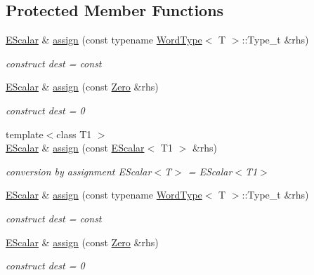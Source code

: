 \subsection*{Protected Member Functions}
\begin{DoxyCompactItemize}
\item 
\mbox{\hyperlink{classENSEM_1_1EScalar}{E\+Scalar}} \& \mbox{\hyperlink{classENSEM_1_1EScalar_a9b88ad4d69d05f69b6483701487ddb74}{assign}} (const typename \mbox{\hyperlink{structENSEM_1_1WordType}{Word\+Type}}$<$ T $>$\+::Type\+\_\+t \&rhs)
\begin{DoxyCompactList}\small\item\em construct dest = const \end{DoxyCompactList}\item 
\mbox{\hyperlink{classENSEM_1_1EScalar}{E\+Scalar}} \& \mbox{\hyperlink{classENSEM_1_1EScalar_a6900444b0a609115a30ef8fc95a43da5}{assign}} (const \mbox{\hyperlink{structENSEM_1_1Zero}{Zero}} \&rhs)
\begin{DoxyCompactList}\small\item\em construct dest = 0 \end{DoxyCompactList}\item 
{\footnotesize template$<$class T1 $>$ }\\\mbox{\hyperlink{classENSEM_1_1EScalar}{E\+Scalar}} \& \mbox{\hyperlink{classENSEM_1_1EScalar_aa9a54e03830d13eb6a124c64c6a46dd1}{assign}} (const \mbox{\hyperlink{classENSEM_1_1EScalar}{E\+Scalar}}$<$ T1 $>$ \&rhs)
\begin{DoxyCompactList}\small\item\em conversion by assignment E\+Scalar$<$\+T$>$ = E\+Scalar$<$\+T1$>$ \end{DoxyCompactList}\item 
\mbox{\hyperlink{classENSEM_1_1EScalar}{E\+Scalar}} \& \mbox{\hyperlink{classENSEM_1_1EScalar_a9b88ad4d69d05f69b6483701487ddb74}{assign}} (const typename \mbox{\hyperlink{structENSEM_1_1WordType}{Word\+Type}}$<$ T $>$\+::Type\+\_\+t \&rhs)
\begin{DoxyCompactList}\small\item\em construct dest = const \end{DoxyCompactList}\item 
\mbox{\hyperlink{classENSEM_1_1EScalar}{E\+Scalar}} \& \mbox{\hyperlink{classENSEM_1_1EScalar_a6900444b0a609115a30ef8fc95a43da5}{assign}} (const \mbox{\hyperlink{structENSEM_1_1Zero}{Zero}} \&rhs)
\begin{DoxyCompactList}\small\item\em construct dest = 0 \end{DoxyCompactList}\item 

\end{DoxyCompactItemize}
